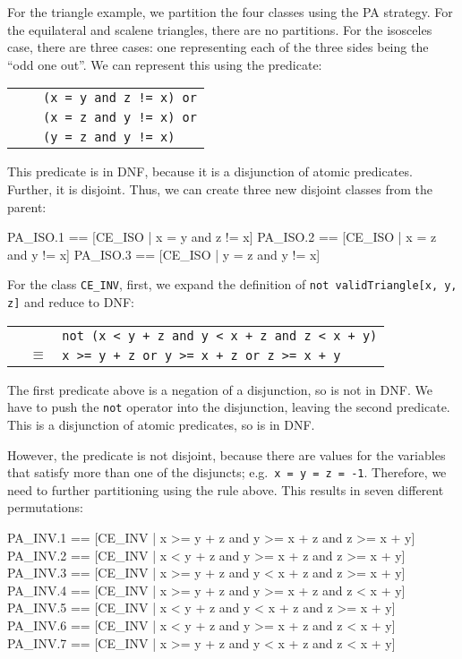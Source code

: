 \begin{example}
For the triangle example, we partition the four classes using the PA strategy. For the equilateral and scalene triangles, there are no partitions. For the isosceles case, there are three cases: one representing each of the three sides being the ``odd one out''. We can represent this using the predicate:

\begin{tabular}{lll}
 &          & \verb+(x = y and z != x) or+\\
 &          & \quad\verb+(x = z and y != x) or+\\
 &          & \quad\verb+(y = z and y != x)+
\end{tabular}

This predicate is in DNF, because it is a disjunction of atomic predicates. Further, it is disjoint. Thus, we can create three new disjoint classes from the parent:

\lstset{aboveskip=3mm}
\lstset{language=}
\begin{alloy}
 PA_ISO.1 == [CE_ISO | x = y and z != x]
 PA_ISO.2 == [CE_ISO | x = z and y != x]
 PA_ISO.3 == [CE_ISO | y = z and y != x]
\end{alloy}


For the class \texttt{CE\_INV}, first, we expand the definition of \verb+not validTriangle[x, y, z]+ and reduce to DNF:

\begin{tabular}{lll}
 &          & \verb|not (x < y + z and y < x + z and z < x + y)|\\
 & $\equiv$ & \verb|x >= y + z or y >= x + z or z >= x + y|
\end{tabular}

The first predicate above is a negation of a disjunction, so is not in DNF. We have to push the \texttt{not} operator into the disjunction, leaving the second predicate. This is a disjunction of atomic predicates, so is in DNF.

However, the predicate is not disjoint, because there are  values for the variables that satisfy more than one of the disjuncts; e.g.\ \verb+x = y = z = -1+. Therefore, we need to further partitioning using the rule above. This results in seven different permutations:

\lstset{aboveskip=3mm}
\lstset{language=}
\begin{alloy}
PA_INV.1 == [CE_INV | x >= y + z and y >= x + z and z >= x + y]
PA_INV.2 == [CE_INV | x <  y + z and y >= x + z and z >= x + y]
PA_INV.3 == [CE_INV | x >= y + z and y <  x + z and z >= x + y]
PA_INV.4 == [CE_INV | x >= y + z and y >= x + z and z <  x + y]
PA_INV.5 == [CE_INV | x <  y + z and y <  x + z and z >= x + y]
PA_INV.6 == [CE_INV | x <  y + z and y >= x + z and z <  x + y]
PA_INV.7 == [CE_INV | x >= y + z and y <  x + z and z <  x + y]
\end{alloy}


\end{example}
